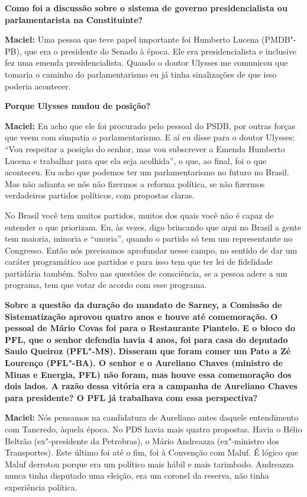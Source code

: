 \textbf{Como foi a discussão sobre o sistema de governo presidencialista
ou parlamentarista na Constituinte?}

\textbf{Maciel:} Uma pessoa que teve papel importante foi Humberto
Lucena (PMDB"-PB), que era o presidente do Senado à época. Ele era
presidencialista e inclusive fez uma emenda presidencialista. Quando o
doutor Ulysses me comunicou que tomaria o caminho do parlamentarismo eu
já tinha sinalizações de que isso poderia acontecer.

\textbf{Porque Ulysses mudou de posição?}

\textbf{Maciel:} Eu acho que ele foi procurado pelo pessoal do PSDB, por
outras forças que veem com simpatia o parlamentarismo. E aí eu disse
para o doutor Ulysses: ``Vou respeitar a posição do senhor, mas vou
subscrever a Emenda Humberto Lucena e trabalhar para que ela seja
acolhida'', o que, ao final, foi o que aconteceu. Eu acho que podemos
ter um parlamentarismo no futuro no Brasil. Mas não adianta se nós não
fizermos a reforma política, se não fizermos verdadeiros partidos
políticos, com propostas claras.

No Brasil você tem muitos partidos, muitos dos quais você não é capaz de
entender o que priorizam. Eu, às vezes, digo brincando que aqui no
Brasil a gente tem maioria, minoria e ``unoria'', quando o partido só
tem um representante no Congresso. Então nós precisamos aprofundar nesse
campo, no sentido de dar um caráter programático aos partidos e para
isso tem que ter lei de fidelidade partidária também. Salvo nas questões
de consciência, se a pessoa adere a um programa, tem que votar de acordo
com esse programa.

\textbf{Sobre a questão da duração do mandato de Sarney, a Comissão de
Sistematização aprovou quatro anos e houve até comemoração. O pessoal de
Mário Covas foi para o Restaurante Piantelo. E o bloco do PFL, que o
senhor defendia havia 4 anos, foi para casa do deputado Saulo Queiroz
(PFL"-MS).} \textbf{Disseram que foram comer um Pato a Zé Lourenço
(PFL"-BA). O senhor e o Aureliano Chaves (ministro de Minas e Energia,
PFL) não foram, mas houve essa comemoração dos dois lados. A razão dessa
vitória era a campanha de Aureliano Chaves para presidente? O PFL já
trabalhava com essa perspectiva?}

\textbf{Maciel:} Nós pensamos na candidatura de Aureliano antes daquele
entendimento com Tancredo, àquela época. No PDS havia mais quatro
propostas. Havia o Hélio Beltrão (ex"-presidente da Petrobras), o Mário
Andreazza (ex"-ministro dos Transportes). Este último foi até o fim, foi
à Convenção com Maluf. É lógico que Maluf derrotou porque era um
político mais hábil e mais tarimbado. Andreazza nunca tinha disputado
uma eleição, era um coronel da reserva, não tinha experiência política.

